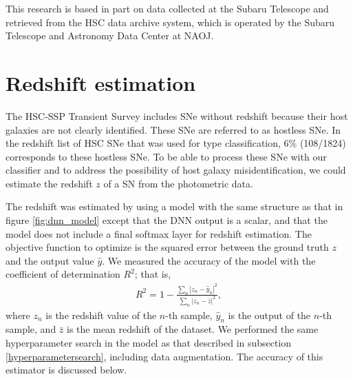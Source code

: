 \documentclass[useamsfonts]{pasj01}
\begin{document}
\begin{ack}
This research is based in part on data collected at the Subaru Telescope and retrieved from the HSC data archive system, which is operated by the Subaru Telescope and Astronomy Data Center at NAOJ.
\end{ack}
%
%
\appendix 
\section*{Redshift estimation}
\label{sec:est_redshift}
The HSC-SSP Transient Survey includes SNe without redshift because their host galaxies are not clearly identified. These SNe are referred to as hostless SNe.
In the redshift list of HSC SNe that was used for type classification, 6\% (108/1824) corresponds to these hostless SNe.
To be able to process these SNe with our classifier and to address the possibility of host galaxy misidentification,
we could estimate the redshift $z$ of a SN from the photometric data.

The redshift was estimated by using a model with the same structure as that in figure \ref{fig:dnn_model} except that the DNN output is a scalar, and that the model does not include a final softmax layer for redshift estimation.
The objective function to optimize is the squared error between the ground truth $z$ and the output value $\hat{y}$.
We measured the accuracy of the model with the coefficient of determination $R^2$; that is,
\begin{eqnarray*}
    R^2 = 1 - \frac{\sum_n \left| z_n - \hat{y}_n \right|^2}{\sum_n \left| z_n - \bar{z} \right|^2}, 
\end{eqnarray*}
where $z_n$ is the redshift value of the $n$-th sample, $\hat{y}_n$ is the output of the $n$-th sample, 
and $\bar{z}$ is the mean redshift of the dataset.
We performed the same hyperparameter search in the model as that described in subsection \ref{hyperparametersearch}, including data augmentation.
The accuracy of this estimator is discussed below.
\end{document}
